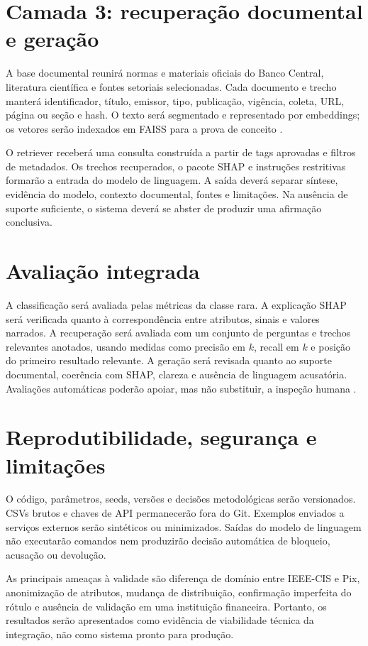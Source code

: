 \section{Camada 3: recuperação documental e geração}

A base documental reunirá normas e materiais oficiais do Banco Central, literatura científica e fontes setoriais selecionadas. Cada documento e trecho manterá identificador, título, emissor, tipo, publicação, vigência, coleta, URL, página ou seção e hash. O texto será segmentado e representado por embeddings; os vetores serão indexados em FAISS para a prova de conceito \cite{reimers2019sentencebert,johnson2021billion}.

O retriever receberá uma consulta construída a partir de tags aprovadas e filtros de metadados. Os trechos recuperados, o pacote SHAP e instruções restritivas formarão a entrada do modelo de linguagem. A saída deverá separar síntese, evidência do modelo, contexto documental, fontes e limitações. Na ausência de suporte suficiente, o sistema deverá se abster de produzir uma afirmação conclusiva.

\section{Avaliação integrada}

A classificação será avaliada pelas métricas da classe rara. A explicação SHAP será verificada quanto à correspondência entre atributos, sinais e valores narrados. A recuperação será avaliada com um conjunto de perguntas e trechos relevantes anotados, usando medidas como precisão em $k$, recall em $k$ e posição do primeiro resultado relevante. A geração será revisada quanto ao suporte documental, coerência com SHAP, clareza e ausência de linguagem acusatória. Avaliações automáticas poderão apoiar, mas não substituir, a inspeção humana \cite{es2024ragas}.

\section{Reprodutibilidade, segurança e limitações}

O código, parâmetros, seeds, versões e decisões metodológicas serão versionados. CSVs brutos e chaves de API permanecerão fora do Git. Exemplos enviados a serviços externos serão sintéticos ou minimizados. Saídas do modelo de linguagem não executarão comandos nem produzirão decisão automática de bloqueio, acusação ou devolução.

As principais ameaças à validade são diferença de domínio entre IEEE-CIS e Pix, anonimização de atributos, mudança de distribuição, confirmação imperfeita do rótulo e ausência de validação em uma instituição financeira. Portanto, os resultados serão apresentados como evidência de viabilidade técnica da integração, não como sistema pronto para produção.
